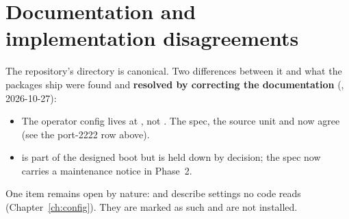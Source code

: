\section{Documentation and implementation disagreements}
The repository's  directory is canonical. Two differences between it and what the packages ship
were found and \textbf{resolved by correcting the documentation} (, 2026-10-27):
\begin{itemize}
\item The operator  config lives at , not . The spec, the source unit and  now agree (see the port-2222 row above).
\item {} is part of the designed boot but is held down by decision; the spec now carries a maintenance notice in Phase~2.
\end{itemize}
One item remains open by nature:  and  describe settings no code reads (Chapter~\ref{ch:config}). They are marked as such and are not installed.
